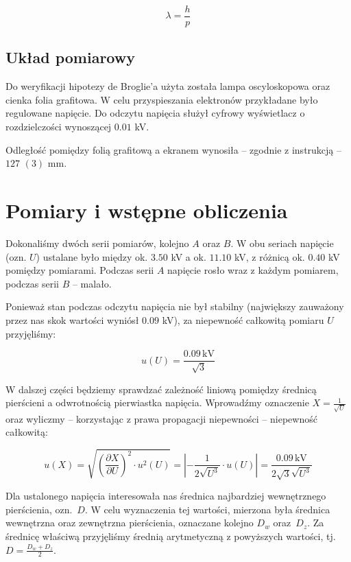 \documentclass[a4paper]{article}
\begin{document}
$$\lambda = \frac h p$$


\subsection{Układ pomiarowy}

Do weryfikacji hipotezy de Broglie'a użyta została lampa oscyloskopowa oraz cienka folia grafitowa.
W celu przyspieszania elektronów przykładane było regulowane napięcie.
Do odczytu napięcia służył cyfrowy wyświetlacz o rozdzielczości wynoszącej $0.01$ kV.

Odległość pomiędzy folią grafitową a ekranem wynosiła -- zgodnie z instrukcją -- $127$ $(3)$ mm.


\section{Pomiary i wstępne obliczenia}

Dokonaliśmy dwóch serii pomiarów, kolejno $A$ oraz $B$.
W obu seriach napięcie (ozn. $U$) ustalane było między ok. $3.50$ kV a ok. $11.10$ kV, z różnicą ok. $0.40$ kV pomiędzy pomiarami.
Podczas serii $A$ napięcie rosło wraz z każdym pomiarem, podczas serii $B$ -- malało.

Ponieważ stan podczas odczytu napięcia nie był stabilny (największy zauważony przez nas skok wartości wyniósł $0.09$ kV), za niepewność całkowitą pomiaru $U$ przyjęliśmy:

$$u(U) = \frac{0.09 \, \text{kV}}{\sqrt 3}$$

W dalszej części będziemy sprawdzać zależność liniową pomiędzy średnicą pierścieni a odwrotnością pierwiastka napięcia.
Wprowadźmy oznaczenie $X = \frac{1}{\sqrt U}$ oraz wyliczmy -- korzystając z prawa propagacji niepewności -- niepewność całkowitą:

$$u(X) = \sqrt{\left(\frac{\partial X}{\partial U}\right)^2 \cdot u^2(U)} = \left| -\frac{1}{2 \sqrt{U^3}} \cdot u(U)\right| = \frac{0.09 \, \text{kV}}{2 \sqrt{3} \sqrt{U^3}}$$

Dla ustalonego napięcia interesowała nas średnica najbardziej wewnętrznego pierścienia, ozn.~$D$.
W celu wyznaczenia tej wartości, mierzona była średnica wewnętrzna oraz zewnętrzna pierścienia, oznaczane kolejno $D_w$ oraz~$D_z$.
Za średnicę właściwą przyjęliśmy średnią arytmetyczną z powyższych wartości, tj.~$D = \frac {D_w + D_z}{2}$.
\end{document}
